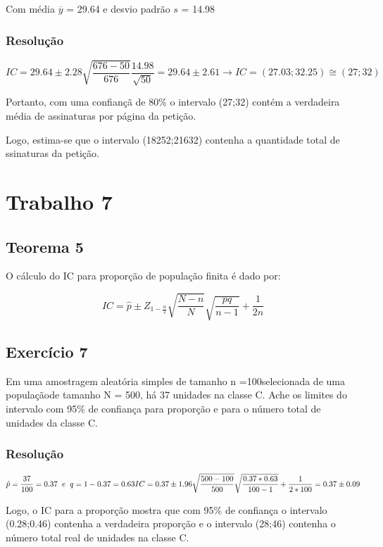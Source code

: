 \documentclass[]{article}
\begin{document}
Com média \(\overline{y}\) = 29.64 e desvio padrão \(s\) = 14.98

\subsubsection{Resolução}\label{resolucao-5}

\[
IC = 29.64\pm 2.28\sqrt{\dfrac{676-50}{676}}\dfrac{14.98}{\sqrt{50}}=29.64\pm 2.61 \rightarrow IC = (27.03;32.25) \cong (27;32)
\]

Portanto, com uma confiançã de 80\% o intervalo (27;32) contém a
verdadeira média de assinaturas por página da petição.

Logo, estima-se que o intervalo (18252;21632) contenha a quantidade
total de ssinaturas da petição.

\section{Trabalho 7}\label{trabalho-7}

\subsection{Teorema 5}\label{teorema-5}

O cálculo do IC para proporção de população finita é dado por:

\[
IC=\hat{p}\pm Z_{1-\frac{\alpha}{2}}\sqrt{\dfrac{N-n}{N}}\sqrt{\dfrac{pq}{n-1}}+\dfrac{1}{2n}
\]

\subsection{Exercício 7}\label{exercicio-7}

Em uma amostragem aleatória simples de tamanho n =100selecionada de uma
populaçãode tamanho N = 500, há 37 unidades na classe C. Ache os limites
do intervalo com 95\% de confiança para proporção e para o número total
de unidades da classe C.

\subsubsection{Resolução}\label{resolucao-6}

\[
\hat{p}=\dfrac{37}{100}=0.37 \;\;e\;\;  q=1-0.37=0.63\\IC=0.37\pm1.96\sqrt{\dfrac{500-100}{500}}\sqrt{\dfrac{0.37*0.63}{100-1}}+\dfrac{1}{2*100}=0.37\pm0.09
\]

Logo, o IC para a proporção mostra que com 95\% de confiança o intervalo
(0.28;0.46) contenha a verdadeira proporção e o intervalo (28;46)
contenha o número total real de unidades na classe C.
\end{document}
